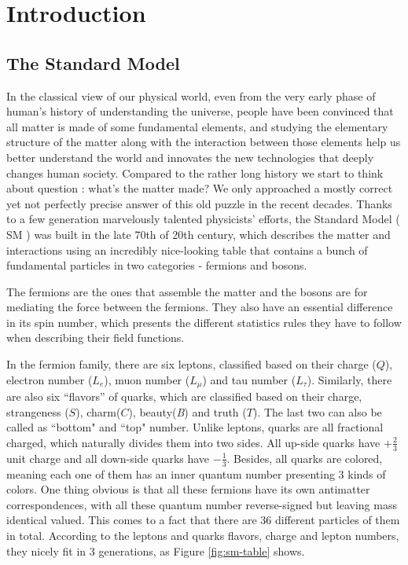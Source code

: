 \chapter{Introduction}

\section{The Standard Model}
In the classical view of our physical world, even from the very early phase of human's history of understanding the universe, people have been convinced that all matter is made of some fundamental elements, and studying the elementary structure of the matter along with the interaction between those elements help us better understand the world and innovates the new technologies that deeply changes human society. Compared to the rather long history we start to think about question : what's the matter made? We only approached a mostly correct yet not perfectly precise answer of this old puzzle in the recent decades. Thanks to a few generation marvelously talented physicists' efforts, the Standard Model ( SM ) was built in the late 70th of 20th century, which describes the matter and interactions using an incredibly nice-looking table that contains a bunch of fundamental particles in two categories - fermions and bosons. 

The fermions are the ones that assemble the matter and the bosons are for mediating the force between the fermions. They also have an essential difference in its spin number, which presents the different statistics rules they have to follow when describing their field functions. 

In the fermion family, there are six leptons, classified based on their charge ($\textit{Q}$), electron number ($\textit{L}_{e}$), muon number ($\textit{L}_{\mu}$) and tau number ($\textit{L}_{\tau}$). Similarly, there are also six ``flavors'' of quarks, which are classified based on their charge, strangeness ($\textit{S}$), charm($\textit{C}$), beauty(\textit{B}) and truth ($\textit{T}$). The last two can also be called as ``bottom" and ``top" number. Unlike leptons, quarks are all fractional charged, which naturally divides them into two sides. All up-side quarks have $+\frac{2}{3}$ unit charge and all down-side quarks have $-\frac{1}{3}$. Besides, all quarks are colored, meaning each one of them has an inner quantum number presenting 3 kinds of colors. One thing obvious is that all these fermions have its own antimatter correspondences, with all these quantum number reverse-signed but leaving mass identical valued. This comes to a fact that there are 36 different particles of them in total. According to the leptons and quarks flavors, charge and lepton numbers, they nicely fit in 3 generations, as Figure \ref{fig:sm-table} shows.

